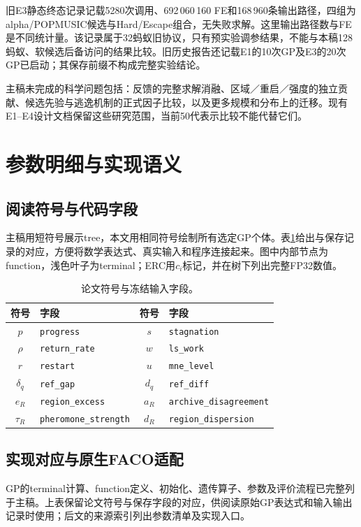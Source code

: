 \documentclass[runningheads,orivec]{llncs}
\begin{document}
旧E3静态终态记录记载5280次调用、692\,060\,160 FE和168\,960条输出路径，四组为alpha/POPMUSIC候选与Hard/Escape组合，无失败求解。这里输出路径数与FE是不同统计量。该记录属于32蚂蚁旧协议，只有预实验调参结果，不能与本稿128蚂蚁、软候选后备访问的结果比较。旧历史报告还记载E1的10次GP及E3的20次GP已启动；其保存前缀不构成完整实验结论。

主稿未完成的科学问题包括：反馈的完整求解消融、区域／重启／强度的独立贡献、候选先验与逃逸机制的正式因子比较，以及更多规模和分布上的迁移。现有E1--E4设计文档保留这些研究范围，当前50代表示比较不能代替它们。

\section{参数明细与实现语义}
\subsection{阅读符号与代码字段}
主稿用短符号展示tree，本文用相同符号绘制所有选定GP个体。表\ref{tab:symbols}给出与保存记录的对应，方便将数学表达式、真实输入和程序连接起来。图中内部节点为function，浅色叶子为terminal；ERC用$c_i$标记，并在树下列出完整FP32数值。
\begin{table}[htbp]\caption{论文符号与冻结输入字段。}\label{tab:symbols}
\centering\small
\begin{tabular}{@{}clcl@{}}
\toprule 符号 & 字段 & 符号 & 字段\\ \midrule
$p$ & \texttt{progress} & $s$ & \texttt{stagnation}\\
$\rho$ & \texttt{return\_rate} & $w$ & \texttt{ls\_work}\\
$r$ & \texttt{restart} & $u$ & \texttt{mne\_level}\\
$\delta_q$ & \texttt{ref\_gap} & $d_q$ & \texttt{ref\_diff}\\
$e_R$ & \texttt{region\_excess} & $a_R$ & \texttt{archive\_disagreement}\\
$\tau_R$ & \texttt{pheromone\_strength} & $d_R$ & \texttt{region\_dispersion}\\
\bottomrule
\end{tabular}
\end{table}

\subsection{实现对应与原生FACO适配}
GP的terminal计算、function定义、初始化、遗传算子、参数及评价流程已完整列于主稿。上表保留论文符号与保存字段的对应，供阅读原始GP表达式和输入输出记录时使用；后文的来源索引列出参数清单及实现入口。
\end{document}
